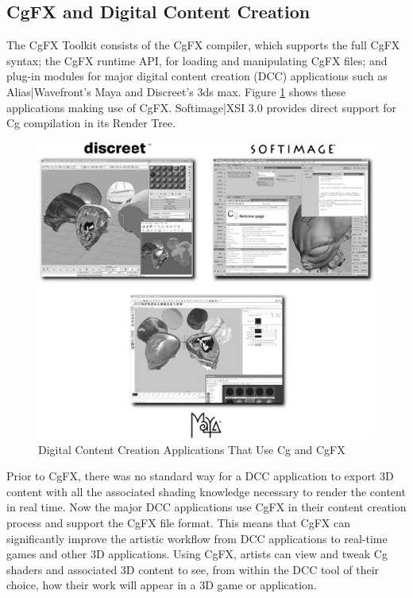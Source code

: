 \documentclass{book}
\begin{document}
\subsection*{CgFX and Digital Content Creation}

The CgFX Toolkit consists of the CgFX compiler, which supports the full CgFX syntax; the CgFX runtime API, for loading and manipulating CgFX files; and plug-in modules for major digital content creation (DCC) applications such as Alias|Wavefront's Maya and Discreet's 3ds max. Figure \ref{fig:1-14} shows these applications making use of CgFX. Softimage|XSI 3.0 provides direct support for Cg compilation in its Render Tree.

\begin{figure}
    \centering
    \includegraphics[width=1\linewidth]{Images/fig1_14.jpg}
    \caption{Digital Content Creation Applications That Use Cg and CgFX}
    \label{fig:1-14}
\end{figure}

Prior to CgFX, there was no standard way for a DCC application to export 3D content with all the associated shading knowledge necessary to render the content in real time. Now the major DCC applications use CgFX in their content creation process and support the CgFX file format. This means that CgFX can significantly improve the artistic workflow from DCC applications to real-time games and other 3D applications. Using CgFX, artists can view and tweak Cg shaders and associated 3D content to see, from within the DCC tool of their choice, how their work will appear in a 3D game or application.
\end{document}
